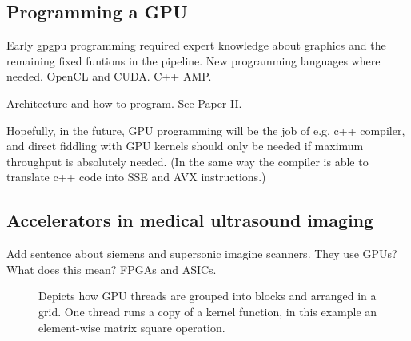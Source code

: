 \subsection{Programming a GPU}
Early gpgpu programming required expert knowledge about graphics and the remaining fixed funtions in the pipeline. New programming languages where needed. OpenCL and CUDA. C++ AMP.

Architecture and how to program. See Paper II.

Hopefully, in the future, GPU programming will be the job of e.g. c++ compiler, and direct fiddling with GPU kernels should only be needed if maximum throughput is absolutely needed. (In the same way the compiler is able to translate c++ code into SSE and AVX instructions.)

\subsection{Accelerators in medical ultrasound imaging }
Add sentence about siemens and supersonic imagine scanners. They use GPUs? What does this mean? FPGAs and ASICs.

\begin{figure}
\centering
{}
\caption{Depicts how GPU threads are grouped into blocks and arranged in a grid. One thread runs a copy of a kernel function, in this example an element-wise matrix square operation.}
\label{fig:gpu_grid}
\end{figure}

